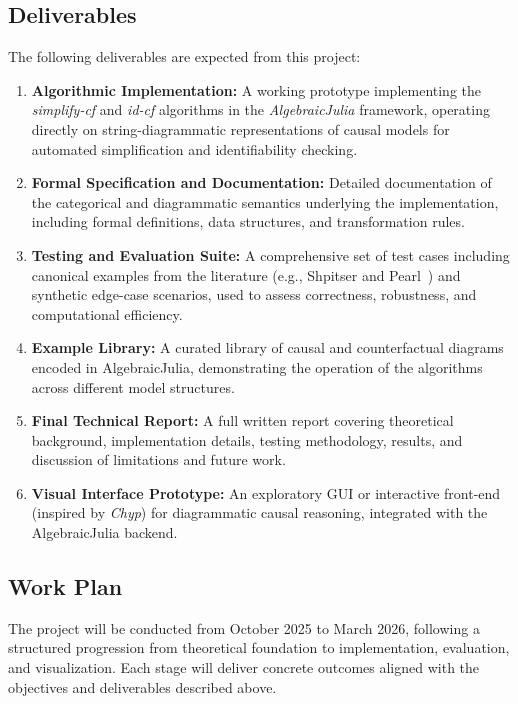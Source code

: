 \documentclass[12pt,a4paper]{article}
\begin{document}
\subsection*{Deliverables}
The following deliverables are expected from this project:
\begin{enumerate}
    \item \textbf{Algorithmic Implementation:}
    A working prototype implementing the \textit{simplify-cf} and \textit{id-cf} algorithms in the \textit{AlgebraicJulia} framework, operating directly on string-diagrammatic representations of causal models for automated simplification and identifiability checking.

    \item \textbf{Formal Specification and Documentation:}
    Detailed documentation of the categorical and diagrammatic semantics underlying the implementation, including formal definitions, data structures, and transformation rules.

    \item \textbf{Testing and Evaluation Suite:}
    A comprehensive set of test cases including canonical examples from the literature (e.g., Shpitser and Pearl~\cite{shpitser2008complete}) and synthetic edge-case scenarios, used to assess correctness, robustness, and computational efficiency.

    \item \textbf{Example Library:}
    A curated library of causal and counterfactual diagrams encoded in AlgebraicJulia, demonstrating the operation of the algorithms across different model structures.

    \item \textbf{Final Technical Report:}
    A full written report covering theoretical background, implementation details, testing methodology, results, and discussion of limitations and future work.


    \item \textbf{Visual Interface Prototype:}
    An exploratory GUI or interactive front-end (inspired by \textit{Chyp}) for diagrammatic causal reasoning, integrated with the AlgebraicJulia backend.
\end{enumerate}


\subsection*{Work Plan}

The project will be conducted from October 2025 to March 2026, following a structured progression from theoretical foundation to implementation, evaluation, and visualization. Each stage will deliver concrete outcomes aligned with the objectives and deliverables described above.
\end{document}
